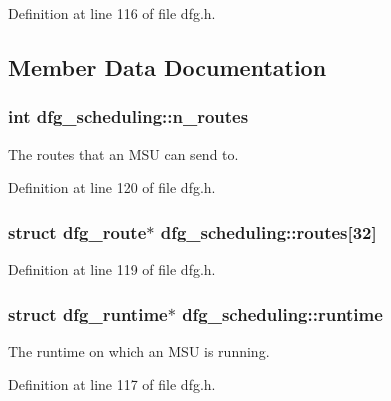 Definition at line 116 of file dfg.\-h.



\subsection{Member Data Documentation}
\hypertarget{structdfg__scheduling_a9b5a55e6c50816ff72a84c246560d907}{
\subsubsection[{n\-\_\-routes}]{\setlength{\rightskip}{0pt plus 5cm}int dfg\-\_\-scheduling\-::n\-\_\-routes}}\label{structdfg__scheduling_a9b5a55e6c50816ff72a84c246560d907}


The routes that an M\-S\-U can send to. 



Definition at line 120 of file dfg.\-h.

\hypertarget{structdfg__scheduling_abc82b642d4cdf20c3cb1d3de7b931fed}{
\subsubsection[{routes}]{\setlength{\rightskip}{0pt plus 5cm}struct {\bf dfg\-\_\-route}$\ast$ dfg\-\_\-scheduling\-::routes\mbox{[}32\mbox{]}}}\label{structdfg__scheduling_abc82b642d4cdf20c3cb1d3de7b931fed}


Definition at line 119 of file dfg.\-h.

\hypertarget{structdfg__scheduling_aadf67d30ca6ed713e50b99fc6ca7fff0}{
\subsubsection[{runtime}]{\setlength{\rightskip}{0pt plus 5cm}struct {\bf dfg\-\_\-runtime}$\ast$ dfg\-\_\-scheduling\-::runtime}}\label{structdfg__scheduling_aadf67d30ca6ed713e50b99fc6ca7fff0}


The runtime on which an M\-S\-U is running. 



Definition at line 117 of file dfg.\-h.

